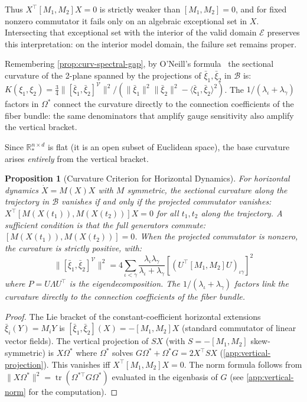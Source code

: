 \documentclass{article}
\newcommand{\RR}{\mathbb{R}}
\DeclareMathOperator{\tr}{tr}
\theoremstyle{plain}
\newtheorem{proposition}{Proposition}
\theoremstyle{definition}
\theoremstyle{remark}
\begin{document}
Thus $X^\top [M_1, M_2] X = 0$ is strictly weaker than $[M_1, M_2]=0$, and for fixed nonzero commutator it fails only on an algebraic exceptional set in $X$.
Intersecting that exceptional set with the interior of the valid domain $\mathcal{E}$ preserves this interpretation: on the interior model domain, the failure set remains proper.

Remembering \cref{prop:curv-spectral-gap}, by O'Neill's formula~\citep{oneill1966fundamental} the sectional curvature of the 2-plane spanned by the projections of $\bar{\xi}_1, \bar{\xi}_2$ in $\mathcal{B}$ is: $K(\xi_1, \xi_2) = \frac{3}{4} \|[\bar{\xi}_1, \bar{\xi}_2]^{\mathcal{V}}\|^2 / (\|\bar{\xi}_1\|^2 \|\bar{\xi}_2\|^2 - \langle \bar{\xi}_1, \bar{\xi}_2 \rangle^2)$.
The $1 / (\lambda_\iota + \lambda_\gamma)$ factors in $\Omega^*$ connect the curvature directly to the connection coefficients of the fiber bundle: the same denominators that amplify gauge sensitivity also amplify the vertical bracket.

Since $\RR_*^{n \times d}$ is flat (it is an open subset of Euclidean space), the base curvature arises \emph{entirely} from the vertical bracket.

\begin{proposition}[Curvature Criterion for Horizontal Dynamics]\label{prop:curvature-criterion}
For horizontal dynamics $\dot{X} = M(X) X$ with $M$ symmetric, the sectional curvature along the trajectory in $\mathcal{B}$ vanishes if and only if the projected commutator vanishes: $X^\top [M(X(t_1)), M(X(t_2))] X = 0$ for all $t_1, t_2$ along the trajectory.
A sufficient condition is that the full generators commute: $[M(X(t_1)), M(X(t_2))] = 0$.
When the projected commutator is nonzero, the curvature is strictly positive, with:
\begin{equation}
\|[\bar{\xi}_1, \bar{\xi}_2]^{\mathcal{V}}\|^2 = 4 \sum_{\iota < \gamma} \frac{\lambda_\iota \lambda_\gamma}{\lambda_\iota + \lambda_\gamma} [(U^\top [M_1, M_2] U)_{\iota\gamma}]^2
\end{equation}
where $P = U \Lambda U^\top$ is the eigendecomposition. The $1 / (\lambda_\iota + \lambda_\gamma)$ factors link the curvature directly to the connection coefficients of the fiber bundle.
\end{proposition}

\begin{proof}
The Lie bracket of the constant-coefficient horizontal extensions $\bar{\xi}_i(Y) = M_i Y$ is $[\bar{\xi}_1, \bar{\xi}_2](X) = -[M_1, M_2] X$ (standard commutator of linear vector fields).
The vertical projection of $SX$ (with $S = -[M_1, M_2]$ skew-symmetric) is $X\Omega^*$ where $\Omega^*$ solves $G\Omega^* + \Omega^* G = 2 X^\top S X$ (\cref{app:vertical-projection}).
This vanishes iff $X^\top [M_1, M_2] X = 0$.
The norm formula follows from $\|X\Omega^*\|^2 = \tr(\Omega^{*\top} G \Omega^*)$ evaluated in the eigenbasis of $G$ (see \cref{app:vertical-norm} for the computation).
\end{proof}
\end{document}
